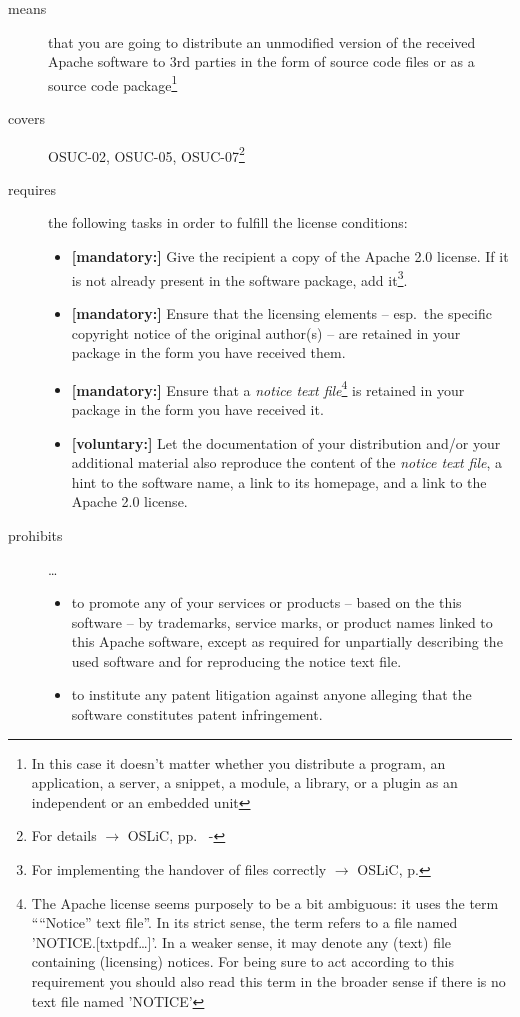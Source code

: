 \begin{description}

\item[means] that you are going to distribute an unmodified version of the
received Apache software to 3rd parties in the form of source code files or as a
source code package\footnote{In this case it doesn't matter whether you 
distribute a program, an application, a server, a snippet, a module, a library,
or a plugin as an independent or an embedded unit}

\item[covers] OSUC-02, OSUC-05, OSUC-07\footnote{For details $\rightarrow$ OSLiC, pp.\ 
\pageref{OSUC-02-DEF} - \pageref{OSUC-07-DEF}}

\item[requires] the following tasks in order to fulfill the license conditions:
\begin{itemize}
  \item \textbf{[mandatory:]} Give the recipient a copy of the Apache 2.0
  license. If it is not already present in the software package, add
  it\footnote{For implementing the handover of files correctly $\rightarrow$
  OSLiC, p. \pageref{DistributingFilesHint}}.
  \item \textbf{[mandatory:]} Ensure that the licensing elements -- esp.\ the
  specific copyright notice of the original author(s) -- are retained in your
  package in the form you have received them.
  \item \textbf{[mandatory:]} Ensure that a \emph{notice text file}\footnote{
  The Apache license seems purposely to be a bit ambiguous: it uses the term
  \enquote{``Notice'' text file}. In its strict sense, the term refers to a file
  named 'NOTICE.[txt\textbar{}pdf\textbar{}\ldots]'. In a weaker sense, it may
  denote any (text) file containing (licensing) notices. For being sure to act
  according to this requirement you should also read this term in the broader
  sense if there is no text file named 'NOTICE'} is retained in your package in
  the form you have received it.
  
  \item \textbf{[voluntary:]} Let the documentation of your distribution and/or
  your additional material also reproduce the content of the \emph{notice text
  file}, a hint to the software name, a link to its homepage, and a link to the
  Apache 2.0 license.
\end{itemize}

\item[prohibits] \ldots
\begin{itemize}
  \item to promote any of your services or products – based on the this software
  – by trademarks, service marks, or product names linked to this Apache
  software, except as required for unpartially describing the used software and
  for reproducing the notice text file.
  \item to institute any patent litigation against anyone alleging that the
  software constitutes patent infringement.
\end{itemize}

\end{description}



